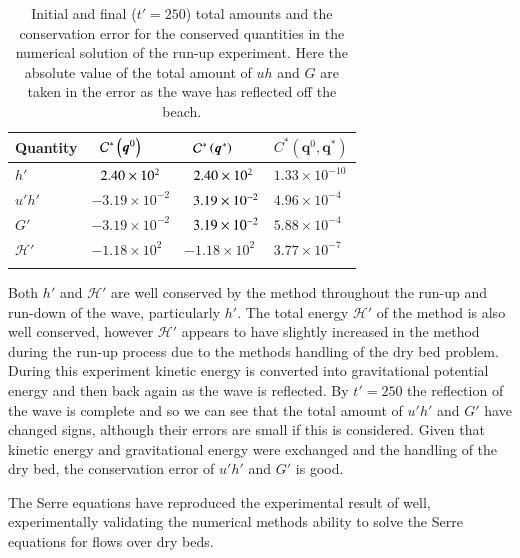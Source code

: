 \documentclass[times]{elsarticle}
\newcommand\T{\rule{0pt}{5ex }}       %
\newcommand\B{\rule[-4ex]{0pt}{4ex }} %
\newcommand{\vecn}[1]{\boldsymbol{#1}}
\begin{document}
\begin{table}
	\centering
	\begin{tabular}{l l l l}
		\hline
		Quantity& $\hphantom{-}\mathcal{C}^*\left(\vecn{q}^0\right)$ & $\hphantom{-}\mathcal{C}^*\left(\vecn{q}^*\right)$ & ${C}^*\left(\vecn{q}^0,\vecn{q}^*\right)$  \T\B\\
		\hline
		$h'$ & $\hphantom{-}2.40\times 10^2$ & $\hphantom{-}2.40 \times 10^2$ & $1.33\times 10^{-10}$ \T \\
		$u'h'$ & $-3.19 \times 10 ^{-2}$ & $\hphantom{-}3.19 \times 10 ^{-2}$ & $4.96\times 10^{-4}$\\
		$G'$ & $-3.19 \times 10 ^{-2}$ & $\hphantom{-}3.19 \times 10 ^{-2}$ & $5.88\times 10^{-4}$\\
		$\mathcal{H}'$ & $-1.18 \times 10^{2}$ & $-1.18 \times 10^{2}$ & $3.77 \times 10^{-7}$ \B\\
		\hline \\
	\end{tabular}
	\caption{Initial and final ($t'=250$) total amounts and the conservation error for the conserved quantities in the numerical solution of the run-up experiment. Here the absolute value of the total amount of $uh$ and $G$ are taken in the error as the wave has reflected off the beach.}
	\label{tab:ConservationSynFEVM}
\end{table}

Both $h'$ and $\mathcal{H}'$ are well conserved by the method throughout the run-up and run-down of the wave, particularly $h'$. The total energy $\mathcal{H}'$ of the method is also well conserved, however $\mathcal{H}'$ appears to have slightly increased in the method during the run-up process due to the methods handling of the dry bed problem. During this experiment kinetic energy is converted into gravitational potential energy and then back again as the wave is reflected. By $t' = 250$ the reflection of the wave is complete and so we can see that the total amount of $u'h'$ and $G'$ have changed signs, although their errors are small if this is considered. Given that kinetic energy and gravitational energy were exchanged and the handling of the dry bed, the conservation error of $u'h'$ and $G'$ is good.

The Serre equations have reproduced the experimental result of \citet{Synolakis-1987-523} well, experimentally validating the numerical methods ability to solve the Serre equations for flows over dry beds.
\end{document}
